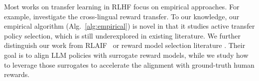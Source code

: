 Most works on transfer learning in RLHF focus on empirical approaches.
For example, \citep{wu2024reuse, hong2024cross} investigate the cross-lingual reward transfer.
To our knowledge, our empirical algorithm (Alg.~\ref{alg:empirical}) is novel in that it studies active transfer policy selection, which is still underexplored in existing literature.
%
We further distinguish our work from RLAIF~\citep{lee2023rlaif,ji2023ai} or reward model selection literature \citep{nguyen2024laser}. Their goal is to align LLM policies with surrogate reward models, while we study how to leverage those surrogates to accelerate the alignment with ground-truth human rewards.